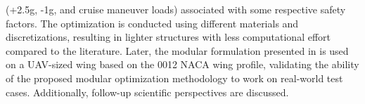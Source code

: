 (+2.5g, -1g, and cruise maneuver loads) associated with some respective safety factors. The optimization is conducted using different materials and discretizations, resulting in lighter structures with less computational effort compared to the literature. Later, the modular formulation presented in  is used on a UAV-sized wing based on the 0012 NACA wing profile, validating the ability of the proposed modular optimization methodology to work on real-world test cases. Additionally, follow-up scientific perspectives are discussed.